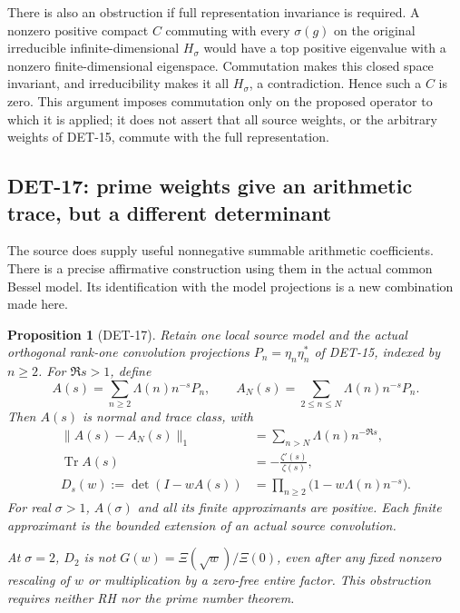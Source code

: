 \documentclass[11pt,a4paper]{article}
\newcommand{\Tr}{\operatorname{Tr}}
\newcommand{\fid}[1]{\textsf{#1}}
\newtheorem*{proposition}{Proposition}
\begin{document}
There is also an obstruction if full representation invariance is
required.  A nonzero positive compact \(C\) commuting with every
\(\sigma(g)\) on the original irreducible infinite-dimensional
\(H_\sigma\) would have a top positive eigenvalue with a nonzero
finite-dimensional eigenspace.  Commutation makes this closed
space invariant, and irreducibility makes it all \(H_\sigma\),
a contradiction.  Hence such a \(C\) is zero.
This argument imposes commutation only on the proposed operator
to which it is applied; it does not assert that all source
weights, or the arbitrary weights of \fid{DET-15}, commute with
the full representation.

\subsection{DET-17: prime weights give an arithmetic trace, but a different determinant}

The source does supply useful nonnegative summable arithmetic
coefficients.  There is a precise affirmative construction using
them in the actual common Bessel model.  Its identification with
the model projections is a new combination made here.

\begin{proposition}[DET-17]
Retain one local source model and the actual orthogonal rank-one
convolution projections \(P_n=\eta_n\eta_n^*\) of \fid{DET-15},
indexed by \(n\ge2\).  For \(\Re s>1\), define
\begin{equation}\label{eq:bessel-prime-operator}
 A(s)=\sum_{n\ge2}\Lambda(n)n^{-s}P_n,\qquad
 A_N(s)=\sum_{2\le n\le N}\Lambda(n)n^{-s}P_n .
\end{equation}
Then \(A(s)\) is normal and trace class, with
\begin{align}
 \|A(s)-A_N(s)\|_1
 &=\sum_{n>N}\Lambda(n)n^{-\Re s},
 \label{eq:bessel-prime-tail}\\
 \Tr A(s)&=-\frac{\zeta'(s)}{\zeta(s)},\\
 D_s(w):=\det(I-wA(s))
 &=\prod_{n\ge2}\bigl(1-w\Lambda(n)n^{-s}\bigr).
 \label{eq:bessel-prime-det}
\end{align}
For real \(\sigma>1\), \(A(\sigma)\) and all its finite
approximants are positive.  Each finite approximant is the
bounded extension of an actual source convolution.

At \(\sigma=2\), \(D_2\) is not \(G(w)=\Xi(\sqrt w)/\Xi(0)\),
even after any fixed nonzero rescaling of \(w\) or multiplication
by a zero-free entire factor.  This obstruction requires neither
RH nor the prime number theorem.
\end{proposition}
\end{document}
